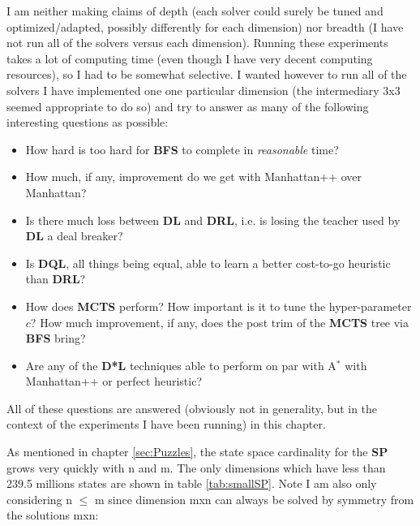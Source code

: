 \noindent I am neither making claims of depth (each solver could surely be tuned and optimized/adapted, possibly differently for each dimension) nor breadth (I have not run all of the solvers versus each dimension). Running these experiments takes a lot of computing time (even though I have very decent computing resources), so I had to be somewhat selective. I wanted however to run all of the solvers I have implemented one one particular dimension (the intermediary 3x3 seemed appropriate to do so) and try to answer as many of the following interesting questions as possible:
\begin{itemize}
\item How hard is too hard for \textbf{BFS} to complete in \textit{reasonable} time?
\item How much, if any, improvement do we get with Manhattan++ over Manhattan?
\item Is there much loss between \textbf{DL} and \textbf{DRL}, i.e. is losing the teacher used by \textbf{DL} a deal breaker?
\item Is \textbf{DQL}, all things being equal, able to learn a better cost-to-go heuristic than \textbf{DRL}?
\item How does \textbf{MCTS} perform? How important is it to tune the hyper-parameter $c$? How much improvement, if any, does the post trim of the \textbf{MCTS} tree via \textbf{BFS} bring?
\item Are any of the \textbf{D*L} techniques able to perform on par with A$^{*}$ with Manhattan++ or perfect heuristic?
\end{itemize}
All of these questions are answered (obviously not in generality, but in the context of the experiments I have been running) in this chapter.












\label{sec:SPLowDimension}


As mentioned in chapter \ref{sec:Puzzles}, the state space cardinality for the \textbf{SP} grows very quickly with n and m. The only dimensions which have less than 239.5 millions states are shown in table \ref{tab:smallSP}. Note I am also only considering n $\leq$ m since dimension mxn can always be solved by symmetry from the solutions mxn:


